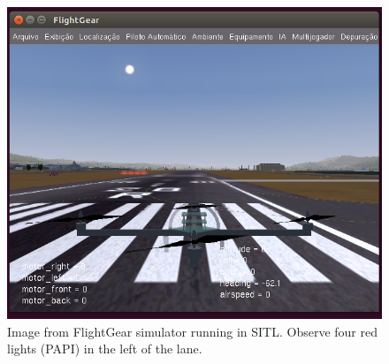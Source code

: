 \begin{figure}[ht!] 
\centering
\includegraphics[width=1.0\textwidth]{Cap3/fig_papi_lights}
\caption{Image from FlightGear simulator running in SITL. Observe four red lights (PAPI) in the left of the lane. }
\label{fig_papi_lights}
\end{figure}




